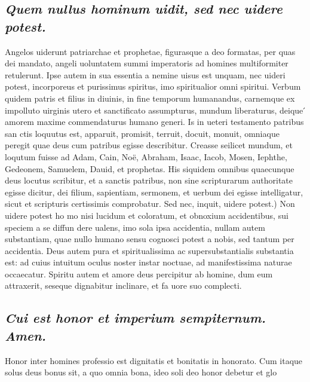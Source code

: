 \documentclass{article}
\begin{document}
\begin{pages}
\subsection*{\textit{Quem nullus hominum uidit, sed nec uidere potest. }}\pstart Angelos uiderunt patriarchae et prophetae, figurasque a deo formatas, per quas dei mandato, angeli uoluntatem summi imperatoris ad homines multiformiter retulerunt. Ipse autem in sua essentia a nemine uisus est unquam, nec uideri potest, incorporeus et purissimus spiritus, imo spiritualior omni spiritui. Verbum quidem patris et filius in diuinis, in fine temporum humanandus, carnemque ex impolluto uirginis utero et sanctificato assumpturus, mundum liberaturus, deique ́ amorem maxime commendaturus humano generi. Is in ueteri testamento patribus san ctis loquutus est, apparuit, promisit, terruit, docuit, monuit, omniaque peregit quae deus cum patribus egisse describitur. Creasse seilicet mundum, et loqutum fuisse ad Adam, Cain, Noë, Abraham, Isaac, Iacob, Mosen, Iephthe, Gedeonem, Samuelem, Dauid, et prophetas. His siquidem omnibus quaecunque deus locutus scribitur, et a sanctis patribus, non sine scripturarum authoritate egisse dicitur, dei filium, sapientiam, sermonem, et uerbum dei egisse intelligatur, sicut et scripturis certissimis comprobatur. Sed nec, inquit, uidere potest.) Non uidere potest ho mo nisi lucidum et coloratum, et obnoxium accidentibus, sui speciem a se diffun dere ualens, imo sola ipsa accidentia, nullam autem substantiam, quae nullo humano sensu cognosci potest a nobis, sed tantum per accidentia. Deus autem pura et spiritualissima ac supersubstantialis substantia est: ad cuius intuitum oculus noster instar noctuae, ad manifestissima naturae occaecatur. Spiritu autem et amore deus percipitur ab homine, dum eum attraxerit, seseque dignabitur inclinare, et fa uore suo complecti.  \pend
{}
{}
\subsection*{\textit{Cui est honor et imperium sempiternum. Amen. }}\pstart Honor inter homines professio est dignitatis et bonitatis in honorato. Cum itaque solus deus bonus sit, a quo omnia bona, ideo soli deo honor debetur et glo\pend

\end{pages}
\end{document}

